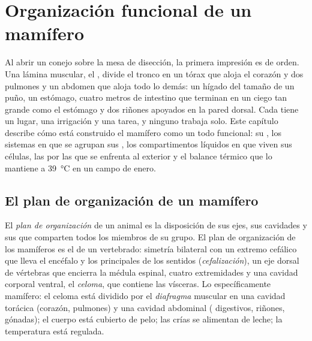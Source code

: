 \chapter{Organización funcional de un mamífero}\label{ch:b1:mammal-organization}

Al abrir un conejo sobre la mesa de disección, la primera impresión es de
orden. Una lámina muscular, el , divide el tronco en un tórax que
aloja el corazón y dos pulmones y un abdomen que aloja todo lo demás: un
hígado del tamaño de un puño, un estómago, cuatro metros de intestino que
terminan en un ciego tan grande como el estómago y dos riñones apoyados en
la pared dorsal. Cada  tiene un lugar, una irrigación y una tarea, y
ninguno trabaja solo. Este capítulo describe cómo está construido el
mamífero como un todo funcional: su , los sistemas en
que se agrupan sus , los compartimentos líquidos en que viven sus
células, las  por las que se enfrenta al exterior
y el balance térmico que lo mantiene a \qty{39}{\celsius} en un campo de
enero.

\section{El plan de organización de un mamífero}

\begin{definition}\label{def:b1:mammal-organization:bodyplan}
El \emph{plan de organización} de un animal es
la disposición de sus ejes, sus cavidades y sus  que comparten todos
los miembros de su grupo. El plan de organización de los mamíferos es el de
un vertebrado: simetría bilateral con un extremo cefálico que lleva el
encéfalo y los principales  de los sentidos
(\emph{cefalización}), un eje dorsal de vértebras que
encierra la médula espinal, cuatro extremidades y una cavidad corporal
ventral, el \emph{celoma}, que contiene las vísceras. Lo
específicamente mamífero: el celoma está dividido por el
\emph{diafragma} muscular en una cavidad torácica
(corazón, pulmones) y una cavidad abdominal ( digestivos, riñones,
gónadas); el cuerpo está cubierto de pelo; las crías se alimentan de leche;
la temperatura está regulada.
\end{definition}

